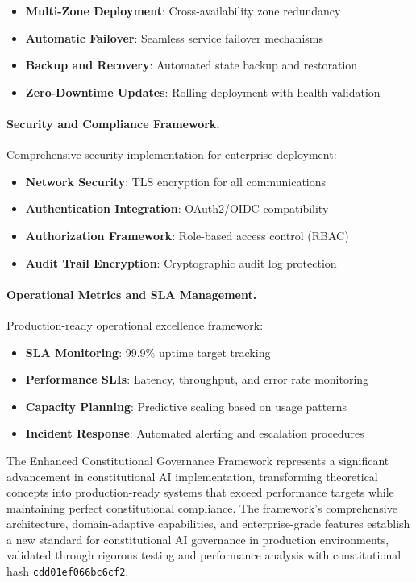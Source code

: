 \documentclass[manuscript,screen,9pt]{acmart}
\begin{document}
\begin{itemize}[itemsep=1pt,parsep=1pt]
    \item \textbf{Multi-Zone Deployment}: Cross-availability zone redundancy
    \item \textbf{Automatic Failover}: Seamless service failover mechanisms
    \item \textbf{Backup and Recovery}: Automated state backup and restoration
    \item \textbf{Zero-Downtime Updates}: Rolling deployment with health validation
\end{itemize}

\paragraph{Security and Compliance Framework.}
Comprehensive security implementation for enterprise deployment:

\begin{itemize}[itemsep=1pt,parsep=1pt]
    \item \textbf{Network Security}: TLS encryption for all communications
    \item \textbf{Authentication Integration}: OAuth2/OIDC compatibility
    \item \textbf{Authorization Framework}: Role-based access control (RBAC)
    \item \textbf{Audit Trail Encryption}: Cryptographic audit log protection
\end{itemize}

\paragraph{Operational Metrics and SLA Management.}
Production-ready operational excellence framework:

\begin{itemize}[itemsep=1pt,parsep=1pt]
    \item \textbf{SLA Monitoring}: 99.9\% uptime target tracking
    \item \textbf{Performance SLIs}: Latency, throughput, and error rate monitoring
    \item \textbf{Capacity Planning}: Predictive scaling based on usage patterns
    \item \textbf{Incident Response}: Automated alerting and escalation procedures
\end{itemize}

The Enhanced Constitutional Governance Framework represents a significant advancement in constitutional AI implementation, transforming theoretical concepts into production-ready systems that exceed performance targets while maintaining perfect constitutional compliance. The framework's comprehensive architecture, domain-adaptive capabilities, and enterprise-grade features establish a new standard for constitutional AI governance in production environments, validated through rigorous testing and performance analysis with constitutional hash \texttt{cdd01ef066bc6cf2}.
\end{document}

